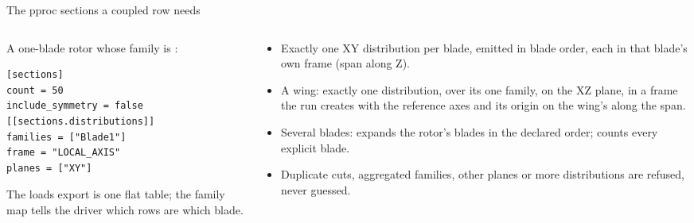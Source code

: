 \begin{frame}[fragile]{The pproc sections a coupled row needs}
\begin{columns}[T]
\begin{column}{0.44\textwidth}
\small A one-blade rotor whose family is :
\begin{lstlisting}[style=ftsbase, basicstyle=\ttfamily\scriptsize]
[sections]
count = 50
include_symmetry = false
[[sections.distributions]]
families = ["Blade1"]
frame = "LOCAL_AXIS"
planes = ["XY"]
\end{lstlisting}
\begin{takeaway}
The loads export is one flat table; the family map tells the driver which
rows are which blade.
\end{takeaway}
\end{column}
\begin{column}{0.52\textwidth}
\begin{itemize}\footnotesize
  \item Exactly one XY distribution per blade, emitted in blade order, each in
        that blade's own frame (span along Z).
  \item A wing: exactly one distribution, over its one family, on the XZ
        plane, in a frame the run creates with the reference axes and its
        origin on the wing's  along the span.
  \item Several blades:  expands the rotor's blades in the
        declared order;  counts every explicit blade.
  \item Duplicate cuts, aggregated families, other planes or more
        distributions are refused, never guessed.
\end{itemize}
\end{column}
\end{columns}
\end{frame}
